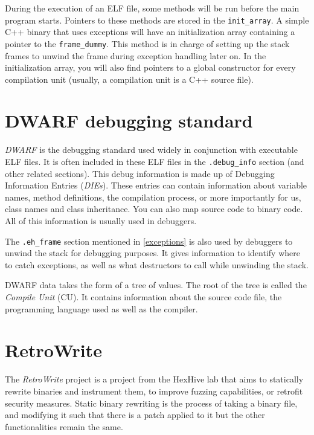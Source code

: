 \documentclass[a4paper,11pt,oneside]{report}
\begin{document}
During the execution of an ELF file, some methods will be run before the main
program starts. Pointers to these methods are stored in the
\texttt{init\_array}.
A simple C++ binary that uses exceptions will have an initialization array
containing a pointer to the \texttt{frame\_dummy}. This method is in charge of
setting up the stack frames to unwind the frame during exception handling
later on.
In the initialization array, you will also find pointers to a global
constructor for every compilation unit (usually, a compilation unit is a C++
source file).


\section{DWARF debugging standard}
\label{dwarf}

\emph{DWARF} is the debugging standard used widely in conjunction with 
executable ELF files.
It is often included in these ELF files in the \texttt{.debug\_info} section 
(and other related sections).
This debug information is made up of Debugging Information Entries 
(\emph{DIEs}).
These entries can contain information about variable names, method definitions, 
the compilation process, or more importantly for us, class names and class 
inheritance. You can also map source code to binary code.
All of this information is usually used in debuggers.

The \texttt{.eh\_frame} section mentioned in \autoref{exceptions} is also used
by debuggers to unwind the stack for debugging purposes.
It gives information to identify where to catch exceptions, as well as what
destructors to call while unwinding the stack.

DWARF data takes the form of a tree of values.
The root of the tree is called the \emph{Compile Unit} (CU).
It contains information about the source code file, the programming language
used as well as the compiler.


\section{RetroWrite} \label{retrowritesection}

The \emph{RetroWrite}\cite{dinesh20oakland} project is a project from the
HexHive lab that aims to statically rewrite binaries and instrument them, to
improve fuzzing capabilities, or retrofit security measures.
Static binary rewriting is the process of taking a binary file, and modifying
it such that there is a patch applied to it but the other functionalities
remain the same.
\end{document}
